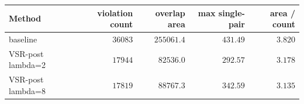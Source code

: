 \begin{tabular}{l|rrrr}
\toprule
Method & violation count & overlap area & max single-pair & area / count \\
\midrule
baseline & $36083$ & $255061.4$ & $431.49$ & $3.820$ \\
VSR-post lambda=2 & $17944$ & $82536.0$ & $292.57$ & $3.178$ \\
VSR-post lambda=8 & $17819$ & $88767.3$ & $342.59$ & $3.135$ \\
\bottomrule
\end{tabular}
